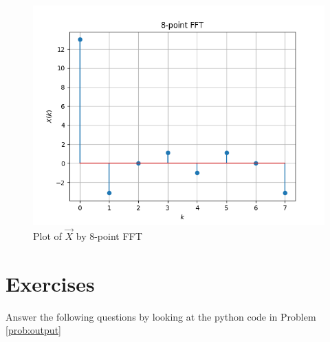 \documentclass[journal,12pt,twocolumn]{IEEEtran}
\renewcommand\thesection{\arabic{section}}
\begin{document}
\begin{enumerate}[label=\thesection.\arabic*]
		\begin{figure}[!ht]
			\centering
			\includegraphics[width=\columnwidth]{figs/7.13.png}
			\caption{Plot of $\vec{X}$ by $8$-point FFT}
			\label{fig-7.13}	
		\end{figure} 
\end{enumerate}


\section{Exercises}
	Answer the following questions by looking at the python code in Problem \ref{prob:output}
	
\end{document}
